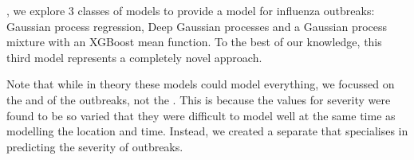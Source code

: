\documentclass[letterpaper,10pt,english]{sphinxmanual}
\begin{document}
, we explore 3 classes of models to provide a model for influenza outbreaks: Gaussian process regression, Deep Gaussian processes and a Gaussian process mixture with an XGBoost mean function. To the best of our knowledge, this third model represents a completely novel approach.

Note that while in theory these models could model everything, we focussed on the  and  of the outbreaks, not the . This is because the values for severity were found to be so varied that they were difficult to model well at the same time as modelling the location and time. Instead, we created a separate {\hyperref[\detokenize{models/how_big:bayesian}]{}} that specialises in predicting the severity of outbreaks.
\end{document}
